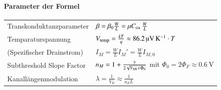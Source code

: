 



\paragraph{Parameter der Formel}

\renewcommand{\arraystretch}{1.5}
\begin{tabular}{ll}
    Transkonduktanzparameter        & $\beta = \beta_0 \frac{W}{L} = \mu C_{\rm ox} \, \frac{W}{L}$ \\
    Temparaturspannung              & $V_{\rm temp} = \frac{k T}{q} \approx \qty{86.2}{\micro\volt\per\kelvin} \cdot T$                             \\
    (Spezifischer Drainstrom)       & $ I_M = \frac{W}{L} I_{M}' = \frac{W}{L} I_{M, 0}$                                                                                 \\
    Subthreshold Slope Factor       & $n_M = 1 + \frac{\gamma}{2\sqrt{V_{\rm SB}+\Phi_0}}$ \quad mit \quad $\Phi_0 = 2 \Phi_F \approx \qty{0.6}{\volt}$ \\
    Kanallängenmodulation           & $\lambda = \frac{1}{V_E} \approx \frac{1}{a_E L}$
\end{tabular}
\renewcommand{\arraystretch}{1}






